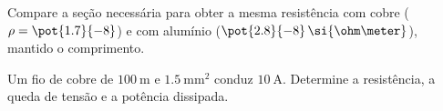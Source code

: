 \begin{questao}[2]{}

Compare a seção necessária para obter a mesma resistência com cobre
($\rho=\pot{1.7}{-8}$) e com alumínio ($\pot{2.8}{-8}\,\si{\ohm\meter}$),
mantido o comprimento.


\end{questao}
\begin{questao}[2]{}

Um fio de cobre de $\SI{100}{\meter}$ e $\SI{1.5}{\milli\meter\squared}$
conduz $\SI{10}{\ampere}$. Determine a resistência, a queda de tensão e a
potência dissipada.


\end{questao}

